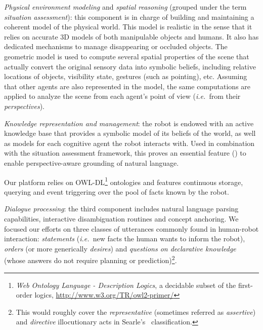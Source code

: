 \documentclass{svmult}
\newcommand{\ie}{{\textit{i.e.~}}}
\begin{document}
\begin{inparaenum}[\itshape 1)]

\item \emph{Physical environment modeling} and \emph{spatial reasoning}
(grouped under the term \emph{situation assessment}): this component is in
charge of building and maintaining a coherent model of the physical world. This
model is realistic in the sense that it relies on accurate 3D models of both
manipulable objects and humans. It also has dedicated mechanisms to manage
disappearing or occluded objects.  The geometric model is used to compute
several spatial properties of the scene that actually convert the original
sensory data into symbolic beliefs, including relative locations of objects,
visibility state, gestures (such as pointing), etc.  Assuming that other agents
are also represented in the model, the same computations are applied to analyze
the scene from each agent's point of view (\ie from their \emph{perspectives}).

\item \emph{Knowledge representation and management}: the robot is endowed with
an active knowledge base that provides a symbolic model of its beliefs of the
world, as well as models for each cognitive agent the robot interacts with.
Used in combination with the situation assessment framework, this proves an
essential feature (\cite{Roy2005,Kruijff2010}) to enable perspective-aware
grounding of natural language.

Our platform relies on OWL-DL\footnote{\emph{Web Ontology Language -
Description Logics}, a decidable subset of the first-order logics,
\url{http://www.w3.org/TR/owl2-primer/}} ontologies and features continuous
storage, querying and event triggering over the pool of facts known by the
robot.

\item \emph{Dialogue processing}: the third component includes natural
language parsing capabilities, interactive disambiguation routines and concept
anchoring. We focused our efforts on three classes of utterances commonly found
in human-robot interaction: \emph{statements} (\ie new facts the human wants to
inform the robot), \emph{orders} (or more generically \emph{desires}) and
\emph{questions on declarative knowledge} (whose answers do not require
planning or prediction)\footnote{This would roughly cover the \emph{representative}
(sometimes referred as \emph{assertive}) and \emph{directive} illocutionary
acts in Searle's~\cite{Searle1976} classification.}.

\end{inparaenum}
\end{document}
